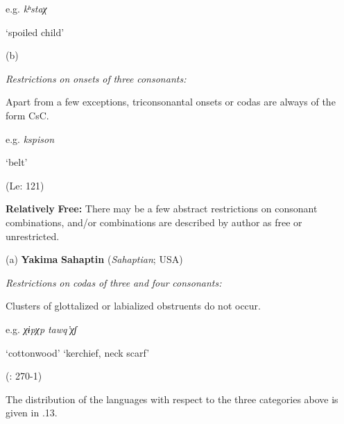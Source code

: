 e.g.  \textit{kʰstaχ}

    ‘spoiled child’

\citep[37]{Haspelmath1993}

(b)

\textit{Restrictions} \textit{on} \textit{onsets} \textit{of} \textit{three} \textit{consonants:}

Apart from a few exceptions, triconsonantal onsets or codas are always of the form CsC.

e.g.  \textit{kspison}

    ‘belt’

(Le\citealt{Sourd1993}: 121)
\z

\ea\label{ex:(3.29)}
  \textbf{Relatively} \textbf{Free:} There may be a few abstract restrictions on consonant combinations, and/or combinations are described by author as free or unrestricted.

(a)  \textbf{Yakima} \textbf{Sahaptin} (\textit{Sahaptian}; USA)

\textit{Restrictions} \textit{on} \textit{codas} \textit{of} \textit{three} \textit{and} \textit{four} \textit{consonants:}

Clusters of glottalized or labialized obstruents do not occur.

e.g.   \textit{χɨpχp}        \textit{tawq’χʃ}

    ‘cottonwood’      ‘kerchief, neck scarf’

(\citealt{HargusBeavert2002}: 270-1)

\z

  The distribution of the languages with respect to the three categories above is given in .13.

